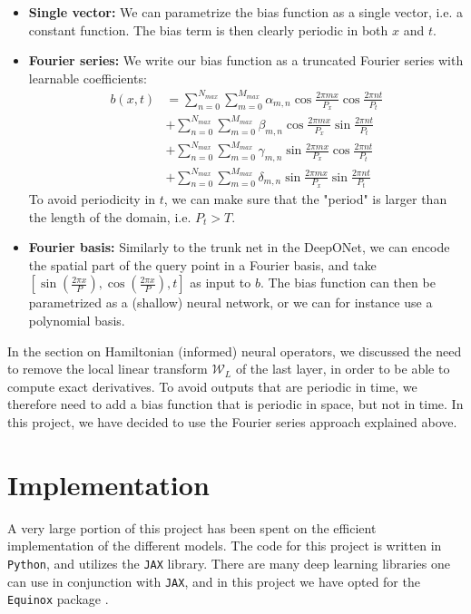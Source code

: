 \begin{itemize}
    \item \textbf{Single vector:} We can parametrize the bias function as a single vector, i.e. a 
    constant function. The bias term is then clearly periodic in both \(x\) and \(t\).\\
    \item \textbf{Fourier series:} We write our bias function as a truncated Fourier series with learnable coefficients:\\
    \[\begin{aligned}
    b(x,t) &= \sum_{n=0}^{N_{max}}\sum_{m=0}^{M_{max}}\alpha_{m,n} \cos{\frac{2\pi m x}{P_x}}\cos{\frac{2\pi n t}{P_t}}\\
    &+ \sum_{n=0}^{N_{max}}\sum_{m=0}^{M_{max}} \beta_{m,n} \cos{\frac{2\pi m x}{P_x}}\sin{\frac{2\pi n t}{P_t}}\\
    &+ \sum_{n=0}^{N_{max}}\sum_{m=0}^{M_{max}} \gamma_{m,n} \sin{\frac{2\pi m x}{P_x}}\cos{\frac{2\pi n t}{P_t}}\\
    &+ \sum_{n=0}^{N_{max}}\sum_{m=0}^{M_{max}} \delta_{m,n} \sin{\frac{2\pi m x}{P_x}}\sin{\frac{2\pi n t}{P_t}}
    \end{aligned}\]
    To avoid periodicity in \(t\), we can make sure that the "period" is larger than the length of the domain, 
    i.e. \(P_t > T\).\\
    \item \textbf{Fourier basis:} Similarly to the trunk net in the DeepONet, we can encode the spatial part of the query point in a Fourier basis, and take
    \(\left[\sin(\frac{2\pi x}{P}), \cos(\frac{2\pi x}{P}), t\right]\) as input to \(b\). The bias function can then be parametrized as a (shallow) neural network, 
    or we can for instance use a polynomial basis.
\end{itemize}

In the section on Hamiltonian (informed) neural operators, we discussed the need to remove the local linear transform \(\mathcal{W}_L\) of the last layer, in order to be able to compute exact derivatives. 
To avoid outputs that are periodic in time, we therefore need to add a bias function that is periodic in space, but not in time.
In this project, we have decided to use the Fourier series approach explained above.

\section{Implementation}

A very large portion of this project has been spent on the efficient implementation of the different models.
The code for this project is written in \texttt{Python}, and utilizes the \texttt{JAX} library. 
There are many deep learning libraries one can use in conjunction with \texttt{JAX}, and in this project we have opted for the \texttt{Equinox} package .